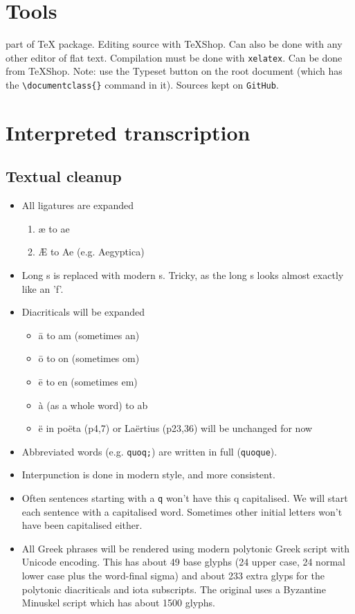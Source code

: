 \documentclass{report}
\begin{document}
\chapter{Tools}
\XeLaTeX{} part of \TeX{} package. Editing source with TeXShop. Can also
be done with any other editor of flat text. 
Compilation must be done with \texttt{xelatex}. Can be done from TeXShop.
Note: use the Typeset button on the root document
(which has the \verb;\documentclass{}; command in it).
Sources kept on \texttt{GitHub}.

\chapter{Interpreted transcription}
\section{Textual cleanup}
\begin{itemize}
\item All ligatures are expanded
	\begin{enumerate}
	\item æ to ae
	\item Æ to Ae (e.g. Aegyptica)
	\end{enumerate}
\item Long s is replaced with modern s. Tricky, as the long s looks almost
exactly like an 'f'.
\item Diacriticals will be expanded
	\begin{itemize}
	\item ā to am (sometimes an)
	\item ō to on (sometimes om)
	\item ē to en (sometimes em)
	\item à (as a whole word) to ab
	\item ë in poëta (p4,7) or Laërtius (p23,36) will be unchanged for now
	\end{itemize}
\item Abbreviated words (e.g. \verb+quoq;+) are written in full (\verb+quoque+).
\item Interpunction is done in modern style, and more consistent.
\item Often sentences starting with a \verb+q+ won't have this q capitalised.
We will start each sentence with a capitalised word. Sometimes other initial
letters won't have been capitalised either.
\item All Greek phrases will be rendered using modern polytonic Greek
script with Unicode encoding.
This has about 49 base glyphs (24 upper case, 24 normal lower case
plus the word-final sigma) and about 233 extra glyps for
the polytonic diacriticals and iota subscripts.
The original uses a Byzantine Minuskel script which has about 1500 glyphs.
\end{itemize}
\end{document}
